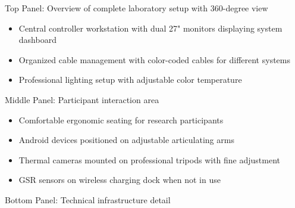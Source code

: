 \documentclass[12pt,a4paper]{report}
\begin{document}
Top Panel: Overview of complete laboratory setup with 360-degree view
\begin{itemize}
\item Central controller workstation with dual 27" monitors displaying system dashboard
\item Organized cable management with color-coded cables for different systems
\item Professional lighting setup with adjustable color temperature

\end{itemize}
Middle Panel: Participant interaction area
\begin{itemize}
\item Comfortable ergonomic seating for research participants
\item Android devices positioned on adjustable articulating arms
\item Thermal cameras mounted on professional tripods with fine adjustment
\item GSR sensors on wireless charging dock when not in use

\end{itemize}
Bottom Panel: Technical infrastructure detail
\end{document}
